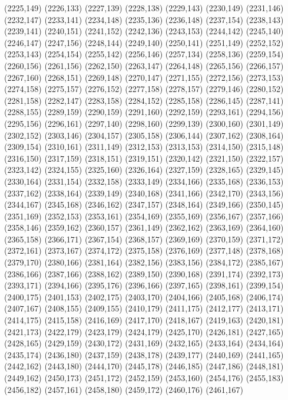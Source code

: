 (2225,149)
(2226,133)
(2227,139)
(2228,138)
(2229,143)
(2230,149)
(2231,146)
(2232,147)
(2233,141)
(2234,148)
(2235,136)
(2236,148)
(2237,154)
(2238,143)
(2239,141)
(2240,151)
(2241,152)
(2242,136)
(2243,153)
(2244,142)
(2245,140)
(2246,147)
(2247,156)
(2248,144)
(2249,140)
(2250,141)
(2251,149)
(2252,152)
(2253,143)
(2254,154)
(2255,142)
(2256,146)
(2257,134)
(2258,136)
(2259,154)
(2260,156)
(2261,156)
(2262,150)
(2263,147)
(2264,148)
(2265,156)
(2266,157)
(2267,160)
(2268,151)
(2269,148)
(2270,147)
(2271,155)
(2272,156)
(2273,153)
(2274,158)
(2275,157)
(2276,152)
(2277,158)
(2278,157)
(2279,146)
(2280,152)
(2281,158)
(2282,147)
(2283,158)
(2284,152)
(2285,158)
(2286,145)
(2287,141)
(2288,155)
(2289,159)
(2290,159)
(2291,160)
(2292,159)
(2293,161)
(2294,156)
(2295,156)
(2296,161)
(2297,140)
(2298,160)
(2299,139)
(2300,160)
(2301,149)
(2302,152)
(2303,146)
(2304,157)
(2305,158)
(2306,144)
(2307,162)
(2308,164)
(2309,154)
(2310,161)
(2311,149)
(2312,153)
(2313,153)
(2314,150)
(2315,148)
(2316,150)
(2317,159)
(2318,151)
(2319,151)
(2320,142)
(2321,150)
(2322,157)
(2323,142)
(2324,155)
(2325,160)
(2326,164)
(2327,159)
(2328,165)
(2329,145)
(2330,164)
(2331,154)
(2332,158)
(2333,149)
(2334,166)
(2335,168)
(2336,153)
(2337,162)
(2338,164)
(2339,149)
(2340,168)
(2341,166)
(2342,170)
(2343,156)
(2344,167)
(2345,168)
(2346,162)
(2347,157)
(2348,164)
(2349,166)
(2350,145)
(2351,169)
(2352,153)
(2353,161)
(2354,169)
(2355,169)
(2356,167)
(2357,166)
(2358,146)
(2359,162)
(2360,157)
(2361,149)
(2362,162)
(2363,169)
(2364,160)
(2365,158)
(2366,171)
(2367,154)
(2368,157)
(2369,169)
(2370,159)
(2371,172)
(2372,161)
(2373,167)
(2374,172)
(2375,158)
(2376,169)
(2377,148)
(2378,168)
(2379,170)
(2380,166)
(2381,164)
(2382,156)
(2383,156)
(2384,172)
(2385,167)
(2386,166)
(2387,166)
(2388,162)
(2389,150)
(2390,168)
(2391,174)
(2392,173)
(2393,171)
(2394,166)
(2395,176)
(2396,166)
(2397,165)
(2398,161)
(2399,154)
(2400,175)
(2401,153)
(2402,175)
(2403,170)
(2404,166)
(2405,168)
(2406,174)
(2407,167)
(2408,155)
(2409,155)
(2410,179)
(2411,175)
(2412,177)
(2413,171)
(2414,175)
(2415,158)
(2416,169)
(2417,170)
(2418,167)
(2419,163)
(2420,181)
(2421,173)
(2422,179)
(2423,179)
(2424,179)
(2425,170)
(2426,181)
(2427,165)
(2428,165)
(2429,159)
(2430,172)
(2431,169)
(2432,165)
(2433,164)
(2434,164)
(2435,174)
(2436,180)
(2437,159)
(2438,178)
(2439,177)
(2440,169)
(2441,165)
(2442,162)
(2443,180)
(2444,170)
(2445,178)
(2446,185)
(2447,186)
(2448,181)
(2449,162)
(2450,173)
(2451,172)
(2452,159)
(2453,160)
(2454,176)
(2455,183)
(2456,182)
(2457,161)
(2458,180)
(2459,172)
(2460,176)
(2461,167)
